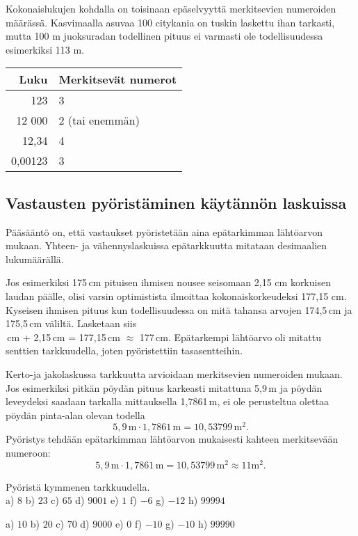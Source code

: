 Kokonaislukujen kohdalla on toisinaan epäselvyyttä merkitsevien numeroiden määrässä. Kasvimaalla asuvaa 100 citykania on tuskin laskettu ihan tarkasti,
mutta 100 m juoksuradan todellinen pituus ei varmasti ole todellisuudessa
esimerkiksi 113 m.

\begin{center}
\begin{tabular}{r|l}
Luku & Merkitsevät numerot \\
\hline
123 & 3 \\
12 000 & 2 (tai enemmän)\\
12,34 & 4 \\
0,00123 & 3
\end{tabular}
\end{center}

\subsection*{Vastausten pyöristäminen käytännön laskuissa}

Pääsääntö on, että vastaukset pyöristetään aina epätarkimman
lähtöarvon mukaan. Yhteen- ja vähennyslaskuissa epätarkkuutta
mitataan desimaalien lukumäärällä.

Jos esimerkiksi 175\,cm pituisen ihmisen
nousee seisomaan 2,15 cm korkuisen laudan päälle, olisi varsin
optimistista ilmoittaa kokonaiskorkeudeksi 177,15 cm. Kyseisen ihmisen pituus kun todellisuudessa on mitä tahansa arvojen
174,5\,cm ja 175,5\,cm väliltä. Lasketaan siis\\
\,cm + 2,15\,cm = 177,15\,cm $\approx$ 177\,cm.
Epätarkempi lähtöarvo oli mitattu senttien tarkkuudella, joten pyöristettiin tasasentteihin.

Kerto-ja jakolaskussa tarkkuutta arvioidaan merkitsevien numeroiden mukaan. Jos esimerkiksi pitkän pöydän pituus karkeasti
mitattuna 5,9\,m ja pöydän leveydeksi saadaan tarkalla mittauksella
1,7861\,m, ei ole perusteltua olettaa pöydän pinta-alan olevan todella
\[ 5,9\,\textrm{m} \cdot 1,7861\,\textrm{m} = 10,53799\,\textrm{m}^2. \]
Pyöristys tehdään epätarkimman
lähtöarvon mukaisesti kahteen merkitsevään numeroon:
\[ 5,9\,\textrm{m} \cdot 1,7861\,\textrm{m} = 10,53799\,\textrm{m}^2 \approx 11 \textrm{m}^2.\]


\begin{tehtava}
Pyöristä kymmenen tarkkuudella. \\
a) $8$ \qquad
b) $23$ \qquad
c) $65$ \qquad
d) $9001$ \qquad
e) $1$ \qquad
f) $-6$ \qquad
g) $-12$ \qquad
h) $99994$
\begin{vastaus}
a) $10$ \qquad
b) $20$ \qquad
c) $70$ \qquad
d) $9000$ \qquad
e) $0$ \qquad
f) $-10$ \qquad
g) $-10$ \qquad
h) $99990$
\end{vastaus}
\end{tehtava}

